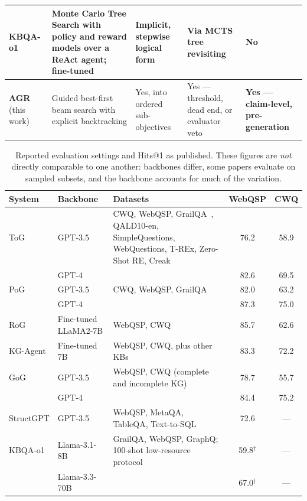 \begin{table}[!tb]
\begin{center}
\begin{tabular}{|l|L{38mm}|L{22mm}|L{22mm}|L{25mm}|}
      \hline
      KBQA-o1~\cite{luo2025kbqao1} & Monte Carlo Tree Search with policy and
      reward models over a ReAct agent; fine-tuned & Implicit, stepwise logical
      form & Via MCTS tree revisiting & No \\
      \hline
      \textbf{AGR} (this work) & Guided best-first beam search with explicit
      backtracking & Yes, into ordered sub-objectives & Yes --- threshold, dead
      end, or evaluator veto & \textbf{Yes --- claim-level, pre-generation} \\
      \hline
    \end{tabular}
  \end{center}
\end{table}

\begin{table}[!tb]
  \begin{center}
    \caption[Reported evaluation settings and Hits@1 as published]{Reported
    evaluation settings and Hits@1 as published. These figures are \emph{not}
    directly comparable to one another: backbones differ, some papers evaluate
    on sampled subsets, and the backbone accounts for much of the variation.}
    \label{tab:reported}
    \footnotesize
    \begin{tabular}{|l|l|L{45mm}|c|c|}
      \hline
      \textbf{System} & \textbf{Backbone} & \textbf{Datasets} &
      \textbf{WebQSP} & \textbf{CWQ} \\
      \hline
      ToG & GPT-3.5 & CWQ, WebQSP, GrailQA~\cite{gu2021beyond}, QALD10-en,
      SimpleQuestions, WebQuestions, T-REx, Zero-Shot RE, Creak & 76.2 & 58.9 \\
       & GPT-4 & & 82.6 & 69.5 \\
      \hline
      PoG & GPT-3.5 & CWQ, WebQSP, GrailQA & 82.0 & 63.2 \\
       & GPT-4 & & 87.3 & 75.0 \\
      \hline
      RoG & Fine-tuned LLaMA2-7B & WebQSP, CWQ & 85.7 & 62.6 \\
      \hline
      KG-Agent & Fine-tuned 7B & WebQSP, CWQ, plus other KBs & 83.3 & 72.2 \\
      \hline
      GoG & GPT-3.5 & WebQSP, CWQ (complete and incomplete KG) & 78.7 & 55.7 \\
       & GPT-4 & & 84.4 & 75.2 \\
      \hline
      StructGPT & GPT-3.5 & WebQSP, MetaQA, TableQA, Text-to-SQL & 72.6 & --- \\
      \hline
      KBQA-o1 & Llama-3.1-8B & GrailQA, WebQSP, GraphQ; 100-shot low-resource
      protocol & 59.8$^{\dagger}$ & --- \\
       & Llama-3.3-70B & & 67.0$^{\dagger}$ & --- \\
      \hline
    \end{tabular}


\end{center}
\end{table}
